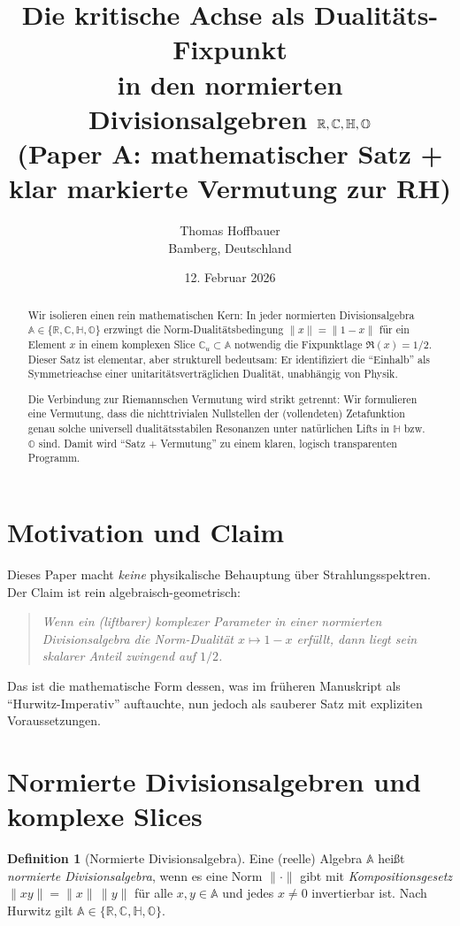 \documentclass[11pt,a4paper]{article}
\title{%
Die kritische Achse als Dualit\"ats-Fixpunkt\\
in den normierten Divisionsalgebren $\R,\C,\Hh,\Okt$\\
(Paper A: mathematischer Satz + klar markierte Vermutung zur RH)
}
\author{Thomas Hoffbauer\\Bamberg, Deutschland}
\date{12. Februar 2026}
\theoremstyle{plain}
\theoremstyle{definition}
\newtheorem{definition}{Definition}
\theoremstyle{remark}
\newcommand{\C}{\mathbb{C}}
\newcommand{\R}{\mathbb{R}}
\newcommand{\Hh}{\mathbb{H}}
\newcommand{\Okt}{\mathbb{O}}
\begin{document}
\maketitle

\begin{abstract}
Wir isolieren einen rein mathematischen Kern: In jeder normierten Divisionsalgebra
$\mathbb{A}\in\{\R,\C,\Hh,\Okt\}$ erzwingt die Norm-Dualit\"atsbedingung
$\|x\|=\|1-x\|$ f\"ur ein Element $x$ in einem komplexen Slice $\C_u\subset\mathbb{A}$
notwendig die Fixpunktlage $\Re(x)=1/2$.
Dieser Satz ist elementar, aber strukturell bedeutsam: Er identifiziert die ``Einhalb'' als
Symmetrieachse einer unitarit\"atsvertr\"aglichen Dualit\"at, unabh\"angig von Physik.

Die Verbindung zur Riemannschen Vermutung wird strikt getrennt: Wir formulieren eine
Vermutung, dass die nichttrivialen Nullstellen der (vollendeten) Zetafunktion genau solche
universell dualit\"atsstabilen Resonanzen unter nat\"urlichen Lifts in $\Hh$ bzw.\ $\Okt$ sind.
Damit wird ``Satz + Vermutung'' zu einem klaren, logisch transparenten Programm.
\end{abstract}

\section{Motivation und Claim}
Dieses Paper macht \emph{keine} physikalische Behauptung \"uber Strahlungsspektren.
Der Claim ist rein algebraisch-geometrisch:

\begin{quote}
\emph{Wenn ein (liftbarer) komplexer Parameter in einer normierten Divisionsalgebra die Norm-Dualit\"at
$x\mapsto 1-x$ erf\"ullt, dann liegt sein skalarer Anteil zwingend auf $1/2$.}
\end{quote}

Das ist die mathematische Form dessen, was im fr\"uheren Manuskript als ``Hurwitz-Imperativ''
auftauchte, nun jedoch als sauberer Satz mit expliziten Voraussetzungen.

\section{Normierte Divisionsalgebren und komplexe Slices}

\begin{definition}[Normierte Divisionsalgebra]
Eine (reelle) Algebra $\mathbb{A}$ hei\ss t \emph{normierte Divisionsalgebra}, wenn es eine Norm
$\|\cdot\|$ gibt mit \emph{Kompositionsgesetz} $\|xy\|=\|x\|\,\|y\|$ f\"ur alle $x,y\in\mathbb{A}$
und jedes $x\neq 0$ invertierbar ist.
Nach Hurwitz gilt $\mathbb{A}\in\{\R,\C,\Hh,\Okt\}$.
\end{definition}
\end{document}
